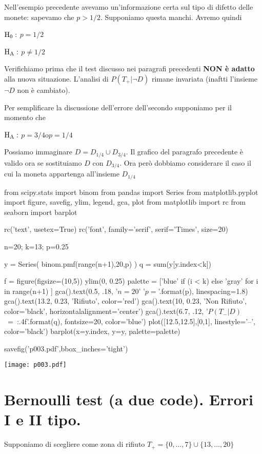\documentclass[10pt,openany]{book}
\def\H0{{\rm H_0}}
\def\HA{{\rm H_A}}
\theoremstyle{mio}
\theoremstyle{liscio}
\begin{document}
Nell'esempio precedente avevamo un'informazione certa sul tipo di difetto delle monete: sapevamo che $p>1/2$. Supponiamo questa manchi. Avremo quindi

$\H0:$ $p=1/2$

$\HA:$ $p\neq1/2$

Verifichiamo prima che il test discusso nei paragrafi precedenti \textbf{NON è adatto\/} alla nuova situazione. L'analisi di $P(T_+|\neg D)$ rimane invariata (inaftti l'insieme $\neg D$ non è cambiato).

Per semplificare la discussione dell'errore dell'secondo supponiamo per il momento che 

$\HA:$ $p=3/4$\quad o\quad $p=1/4$ 

Possiamo immaginare $D=D_{1/4}\cup D_{3/4}$. Il grafico del paragrafo precedente è valido ora se sostituiamo $D$ con $D_{3/4}$. Ora però dobbiamo considerare il caso il cui la moneta appartenga all'insieme $D_{1/4}$

\begin{pycode}
from scipy.stats import binom
from pandas import Series
from matplotlib.pyplot import figure, savefig, ylim, legend, gca, plot
from matplotlib import rc
from seaborn import barplot

rc('text', usetex=True)
rc('font', family='serif', serif='Times', size=20)

n=20; k=13; p=0.25

y = Series( binom.pmf(range(n+1),20,p) )
q = sum(y[y.index<k])

f = figure(figsize=(10,5))
ylim(0, 0.25)
palette = ['blue' if (i < k) else 'gray' for i in range(n+1) ]
gca().text(0.5, .18, '$n=20$\n' '$p={}$'.format(p), linespacing=1.8)
gca().text(13.2, 0.23, 'Rifiuto', color='red')
gca().text(10, 0.23, 'Non Rifiuto', color='black', horizontalalignment='center')
gca().text(6.7, .12, '$P(T_-|D)$\ =\ {:.4f}'.format(q), fontsize=20, color='blue')
plot([12.5,12.5],[0,1], linestyle='--', color='black')
barplot(x=y.index, y=y, palette=palette)

savefig('p003.pdf',bbox_inches='tight')
\end{pycode}
\hfil\texttt{[image: p003.pdf]}


\clearpage\section{Bernoulli test (a due code). Errori I e II tipo.}

Supponiamo di scegliere come zona di rifiuto $T_+=\{0,\dots,7\}\cup \{13,\dots,20\}$
\end{document}
